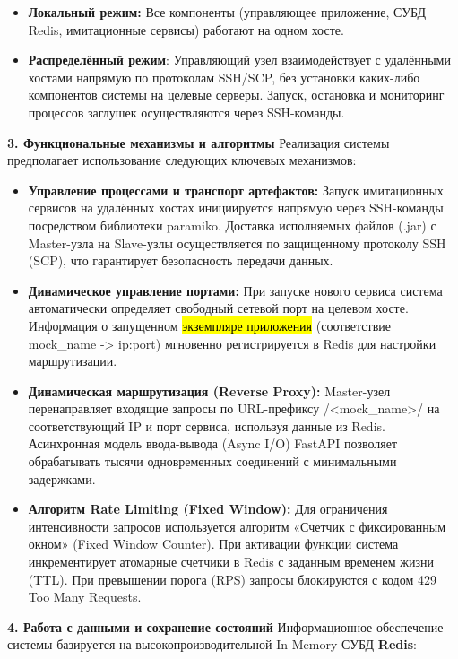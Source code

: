 \documentclass[
]{article}
\begin{document}
\begin{itemize}
\item
  \textbf{Локальный режим:} Все компоненты (управляющее приложение, СУБД
  Redis, имитационные сервисы) работают на одном хосте.
\item
  \textbf{Распределённый режим}: Управляющий узел взаимодействует с
  удалёнными хостами напрямую по протоколам SSH/SCP, без установки
  каких-либо компонентов системы на целевые серверы. Запуск, остановка и
  мониторинг процессов заглушек осуществляются через SSH-команды.
\end{itemize}

\textbf{3. Функциональные механизмы и алгоритмы} Реализация системы
предполагает использование следующих ключевых механизмов:

\begin{itemize}
\item
  \textbf{Управление процессами и транспорт артефактов:} Запуск
  имитационных сервисов на удалённых хостах инициируется напрямую через
  SSH-команды посредством библиотеки paramiko. Доставка исполняемых
  файлов (.jar) с Master-узла на Slave-узлы осуществляется по
  защищенному протоколу SSH (SCP), что гарантирует безопасность передачи
  данных.
\item
  \textbf{Динамическое управление портами:} При запуске нового сервиса
  система автоматически определяет свободный сетевой порт на целевом
  хосте. Информация о запущенном \hl{экземпляре приложения}
  (соответствие mock\_name -\textgreater{} ip:port) мгновенно
  регистрируется в Redis для настройки маршрутизации.
\item
  \textbf{Динамическая маршрутизация (Reverse Proxy):} Master-узел
  перенаправляет входящие запросы по URL-префиксу
  /\textless mock\_name\textgreater/ на соответствующий IP и порт
  сервиса, используя данные из Redis. Асинхронная модель ввода-вывода
  (Async I/O) FastAPI позволяет обрабатывать тысячи одновременных
  соединений с минимальными задержками.
\item
  \textbf{Алгоритм Rate Limiting (Fixed Window):} Для ограничения
  интенсивности запросов используется алгоритм «Счетчик с фиксированным
  окном» (Fixed Window Counter). При активации функции система
  инкрементирует атомарные счетчики в Redis с заданным временем жизни
  (TTL). При превышении порога (RPS) запросы блокируются с кодом 429 Too
  Many Requests.
\end{itemize}

\textbf{4. Работа с данными и сохранение состояний} Информационное
обеспечение системы базируется на высокопроизводительной In-Memory СУБД
\textbf{Redis}:
\end{document}

